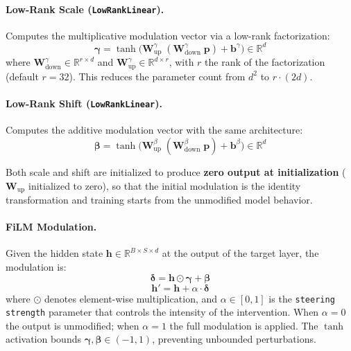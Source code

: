 \paragraph{Low-Rank Scale (\texttt{LowRankLinear}).}
Computes the multiplicative modulation vector via a low-rank factorization:
\begin{equation}
\label{eq:slim_gamma}
\boldsymbol{\gamma} = \tanh\!\big(\mathbf{W}_{\mathrm{up}}^{\gamma}\;(\mathbf{W}_{\mathrm{down}}^{\gamma}\;\mathbf{p}) + \mathbf{b}^{\gamma}\big) \in \mathbb{R}^{d}
\end{equation}
where $\mathbf{W}_{\mathrm{down}}^{\gamma} \in \mathbb{R}^{r \times d}$ and $\mathbf{W}_{\mathrm{up}}^{\gamma} \in \mathbb{R}^{d \times r}$, with $r$ the rank of the factorization (default $r = 32$). This reduces the parameter count from $d^2$ to $r \cdot (2d)$.

\paragraph{Low-Rank Shift (\texttt{LowRankLinear}).}
Computes the additive modulation vector with the same architecture:
\begin{equation}
\label{eq:slim_beta}
\boldsymbol{\beta} = \tanh\!\big(\mathbf{W}_{\mathrm{up}}^{\beta}\;(\mathbf{W}_{\mathrm{down}}^{\beta}\;\mathbf{p}) + \mathbf{b}^{\beta}\big) \in \mathbb{R}^{d}
\end{equation}

Both scale and shift are initialized to produce \textbf{zero output at initialization} ($\mathbf{W}_{\mathrm{up}}$ initialized to zero), so that the initial modulation is the identity transformation and training starts from the unmodified model behavior.

\paragraph{FiLM Modulation.}
Given the hidden state $\mathbf{h} \in \mathbb{R}^{B \times S \times d}$ at the output of the target layer, the modulation is:
\begin{equation}
\label{eq:slim_delta}
\boldsymbol{\delta} = \mathbf{h} \odot \boldsymbol{\gamma} + \boldsymbol{\beta}
\end{equation}
\begin{equation}
\label{eq:slim_apply}
\mathbf{h}' = \mathbf{h} + \alpha \cdot \boldsymbol{\delta}
\end{equation}
where $\odot$ denotes element-wise multiplication, and $\alpha \in [0, 1]$ is the \texttt{steering strength} parameter that controls the intensity of the intervention. When $\alpha = 0$ the output is unmodified; when $\alpha = 1$ the full modulation is applied. The $\tanh$ activation bounds $\boldsymbol{\gamma}, \boldsymbol{\beta} \in (-1, 1)$, preventing unbounded perturbations.


